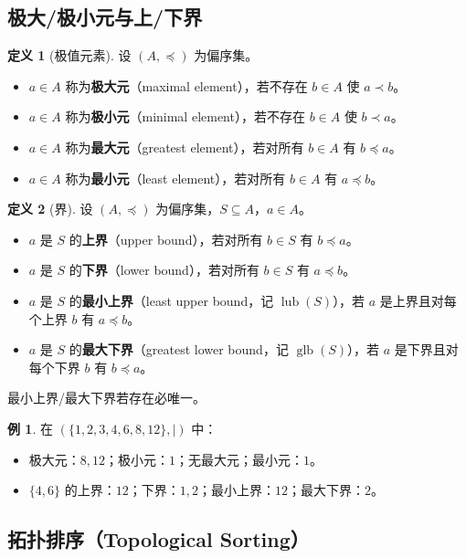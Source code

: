 \documentclass[UTF8,11pt,a4paper]{ctexbook}   %
\theoremstyle{definition}
\newtheorem{definition}{定义}[section]
\newtheorem{example}{例}[section]
\begin{document}
\subsection{极大/极小元与上/下界}

\begin{definition}[极值元素]
设 $(A,\preceq)$ 为偏序集。
\begin{itemize}
    \item $a \in A$ 称为\textbf{极大元}（maximal element），若不存在 $b \in A$ 使 $a \prec b$。
    \item $a \in A$ 称为\textbf{极小元}（minimal element），若不存在 $b \in A$ 使 $b \prec a$。
    \item $a \in A$ 称为\textbf{最大元}（greatest element），若对所有 $b \in A$ 有 $b \preceq a$。
    \item $a \in A$ 称为\textbf{最小元}（least element），若对所有 $b \in A$ 有 $a \preceq b$。
\end{itemize}
\end{definition}

\begin{definition}[界]
设 $(A,\preceq)$ 为偏序集，$S \subseteq A$，$a \in A$。
\begin{itemize}
    \item $a$ 是 $S$ 的\textbf{上界}（upper bound），若对所有 $b \in S$ 有 $b \preceq a$。
    \item $a$ 是 $S$ 的\textbf{下界}（lower bound），若对所有 $b \in S$ 有 $a \preceq b$。
    \item $a$ 是 $S$ 的\textbf{最小上界}（least upper bound，记 $\operatorname{lub}(S)$），若 $a$ 是上界且对每个上界 $b$ 有 $a \preceq b$。
    \item $a$ 是 $S$ 的\textbf{最大下界}（greatest lower bound，记 $\operatorname{glb}(S)$），若 $a$ 是下界且对每个下界 $b$ 有 $b \preceq a$。
\end{itemize}
最小上界/最大下界若存在必唯一。
\end{definition}

\begin{example}
在 $(\{1,2,3,4,6,8,12\},|)$ 中：
\begin{itemize}
    \item 极大元：$8,12$；极小元：$1$；无最大元；最小元：$1$。
    \item $\{4,6\}$ 的上界：$12$；下界：$1,2$；最小上界：$12$；最大下界：$2$。
\end{itemize}
\end{example}

\subsection{拓扑排序（Topological Sorting）}
\end{document}
